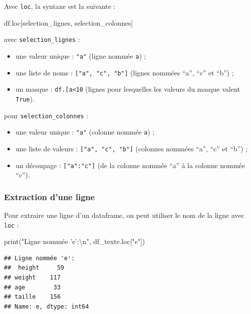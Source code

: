 \documentclass[12pt,]{book}
\newenvironment{Shaded}{\begin{snugshade}}{\end{snugshade}}
\newcommand{\CharTok}[1]{\textcolor[rgb]{0.31,0.60,0.02}{#1}}
\newcommand{\StringTok}[1]{\textcolor[rgb]{0.31,0.60,0.02}{#1}}
\newcommand{\BuiltInTok}[1]{#1}
\newcommand{\NormalTok}[1]{#1}
\providecommand{\tightlist}{%
  \setlength{\itemsep}{0pt}\setlength{\parskip}{0pt}}
\numberwithin{equation}{section}
\numberwithin{countremarque}{section}
\begin{document}
Avec \texttt{loc}, la syntaxe est la suivante :

\begin{Shaded}
\begin{Highlighting}[]
\NormalTok{df.loc[selection_lignes, selection_colonnes]}
\end{Highlighting}
\end{Shaded}

avec \texttt{selection\_lignes} :

\begin{itemize}
\tightlist
\item
  une valeur unique : \texttt{"a"} (ligne nommée \texttt{a}) ;
\item
  une liste de noms : \texttt{{[}"a",\ "c",\ "b"{]}} (lignes nommées
  ``a'', ``c'' et ``b'') ;
\item
  un masque :
  \texttt{df.{[}\textquotesingle{}a\textquotesingle{}{]}\textless{}10}
  (lignes pour lesquelles les valeurs du masque valent \texttt{True}).
\end{itemize}

pour \texttt{selection\_colonnes} :

\begin{itemize}
\tightlist
\item
  une valeur unique : \texttt{"a"} (colonne nommée \texttt{a}) ;
\item
  une liste de valeurs : \texttt{{[}"a",\ "c",\ "b"{]}} (colonnes
  nommées ``a'', ``c'' et ``b'') ;
\item
  un découpage : \texttt{{[}"a":"c"{]}} (de la colonne nommée ``a'' à la
  colonne nommée ``c'').
\end{itemize}

\subsubsection{Extraction d'une ligne}\label{extraction-dune-ligne}

Pour extraire une ligne d'un dataframe, on peut utiliser le nom de la
ligne avec \texttt{loc} :

\begin{Shaded}
\begin{Highlighting}[]
\BuiltInTok{print}\NormalTok{(}\StringTok{"Ligne nommée 'e':}\CharTok{\textbackslash{}n}\StringTok{"}\NormalTok{, df_texte.loc[}\StringTok{"e"}\NormalTok{])}
\end{Highlighting}
\end{Shaded}

\begin{lstlisting}
## Ligne nommée 'e':
##  height     59
## weight    117
## age        33
## taille    156
## Name: e, dtype: int64
\end{lstlisting}
\end{document}
